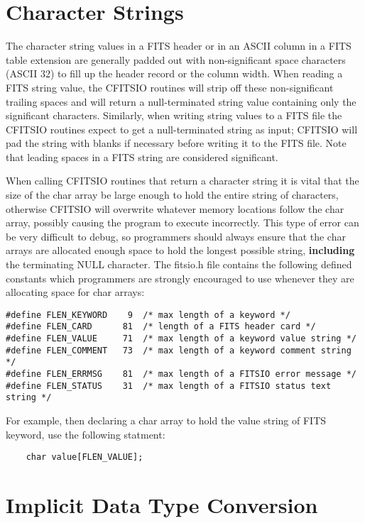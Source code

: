 \section{Character Strings}

The character string values in a FITS header or in an ASCII column in a
FITS table extension are generally padded out with non-significant
space characters (ASCII 32) to fill up the header record or the column
width.  When reading a FITS string value, the  CFITSIO routines will
strip off these non-significant trailing spaces and will return a
null-terminated string value containing only the significant
characters.  Similarly, when writing string values to a FITS file the
CFITSIO routines expect to get a null-terminated string as input;
CFITSIO will pad the string with blanks if necessary before writing it
to the FITS file.  Note that leading spaces in a FITS string are
considered significant.

When calling CFITSIO routines that return a character string it is
vital that the size of the char array be large enough to hold the
entire string of characters, otherwise CFITSIO will overwrite whatever
memory locations follow the char array, possibly causing the program to
execute incorrectly.  This type of error can be very difficult to
debug, so programmers should always ensure that the char arrays are
allocated enough space to hold the longest possible string, {\bf
including} the terminating NULL character.  The fitsio.h file contains
the following defined constants which programmers are strongly
encouraged to use whenever they are allocating space for char arrays:

\begin{verbatim}
#define FLEN_KEYWORD    9  /* max length of a keyword */
#define FLEN_CARD      81  /* length of a FITS header card */
#define FLEN_VALUE     71  /* max length of a keyword value string */
#define FLEN_COMMENT   73  /* max length of a keyword comment string */
#define FLEN_ERRMSG    81  /* max length of a FITSIO error message */
#define FLEN_STATUS    31  /* max length of a FITSIO status text string */
\end{verbatim}
For example, then declaring a char array to hold the value string
of FITS keyword, use the following statment:

\begin{verbatim}
    char value[FLEN_VALUE];
\end{verbatim}


\section{Implicit Data Type Conversion}

